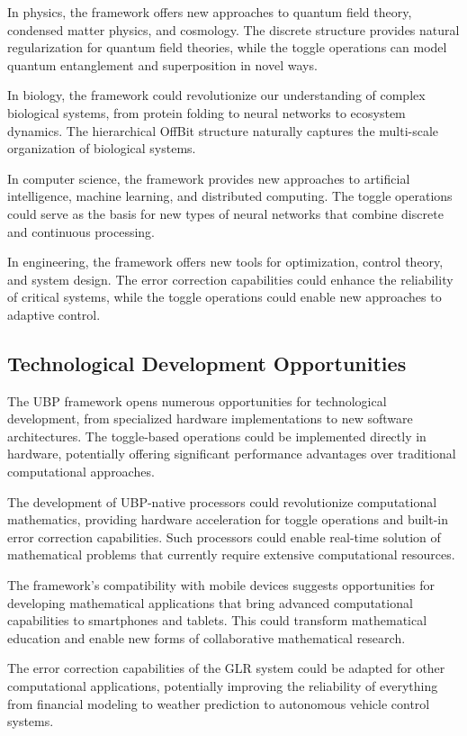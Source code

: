 \documentclass[11pt]{amsart}
\begin{document}
In physics, the framework offers new approaches to quantum field theory, condensed matter physics, and cosmology. The discrete structure provides natural regularization for quantum field theories, while the toggle operations can model quantum entanglement and superposition in novel ways.

In biology, the framework could revolutionize our understanding of complex biological systems, from protein folding to neural networks to ecosystem dynamics. The hierarchical OffBit structure naturally captures the multi-scale organization of biological systems.

In computer science, the framework provides new approaches to artificial intelligence, machine learning, and distributed computing. The toggle operations could serve as the basis for new types of neural networks that combine discrete and continuous processing.

In engineering, the framework offers new tools for optimization, control theory, and system design. The error correction capabilities could enhance the reliability of critical systems, while the toggle operations could enable new approaches to adaptive control.

\subsection{Technological Development Opportunities}

The UBP framework opens numerous opportunities for technological development, from specialized hardware implementations to new software architectures. The toggle-based operations could be implemented directly in hardware, potentially offering significant performance advantages over traditional computational approaches.

The development of UBP-native processors could revolutionize computational mathematics, providing hardware acceleration for toggle operations and built-in error correction capabilities. Such processors could enable real-time solution of mathematical problems that currently require extensive computational resources.

The framework's compatibility with mobile devices suggests opportunities for developing mathematical applications that bring advanced computational capabilities to smartphones and tablets. This could transform mathematical education and enable new forms of collaborative mathematical research.

The error correction capabilities of the GLR system could be adapted for other computational applications, potentially improving the reliability of everything from financial modeling to weather prediction to autonomous vehicle control systems.
\end{document}
